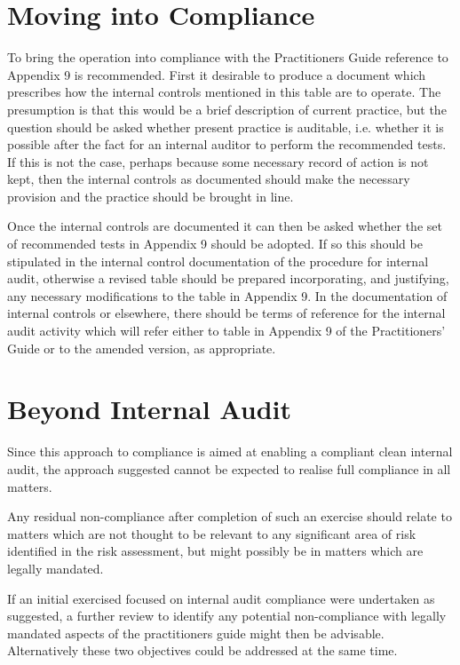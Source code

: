 \documentclass[numreferences]{rbjk}
\begin{document}
\begin{article}
\section{Moving into Compliance}

To bring the operation into compliance with the Practitioners Guide reference to Appendix 9 is recommended.
First it desirable to produce a document which prescribes how the internal controls mentioned in this table are to operate.
The presumption is that this would be a brief description of current practice, but the question should be asked whether present practice is auditable, i.e. whether it is possible after the fact for an internal auditor to perform the recommended tests.
If this is not the case, perhaps because some necessary record of action is not kept, then the internal controls as documented should make the necessary provision and the practice should be brought in line.

Once the internal controls are documented it can then be asked whether the set of recommended tests in Appendix 9 should be adopted.
If so this should be stipulated in the internal control documentation of the procedure for internal audit, otherwise a revised table should be prepared incorporating, and justifying, any necessary modifications to the table in Appendix 9. 
In the documentation of internal controls or elsewhere, there should be terms of reference for the internal audit activity which will refer either to table in Appendix 9 of the Practitioners' Guide or to the amended version, as appropriate.

\section{Beyond Internal Audit}

Since this approach to compliance is aimed at enabling a compliant clean internal audit, the approach suggested cannot be expected to realise full compliance in all matters.

Any residual non-compliance after completion of such an exercise should relate to matters which are not thought to be relevant to any significant area of risk identified in the risk assessment, but might possibly be in matters which are legally mandated.

If an initial exercised focused on internal audit compliance were undertaken as suggested, a further review to identify any potential non-compliance with legally mandated aspects of the practitioners guide might then be advisable.
Alternatively these two objectives could be addressed at the same time.


{\raggedright



} %


\end{article}
\end{document}
